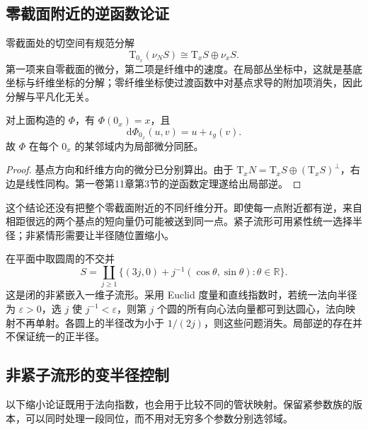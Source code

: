\subsection{零截面附近的逆函数论证}
\label{g2:subsec:1503:02}

零截面处的切空间有规范分解
\[
	\mathrm{T}_{0_x}(\nu_NS)\cong\mathrm{T}_xS\oplus\nu_xS.
\]
第一项来自零截面的微分，第二项是纤维中的速度。在局部丛坐标中，这就是基底坐标与纤维坐标的分解；零纤维坐标使过渡函数中对基点求导的附加项消失，因此分解与平凡化无关。

\begin{proposition}\label{g2:prop:normal-exponential-local}
	对上面构造的 \(\Phi\)，有 \(\Phi(0_x)=x\)，且
	\[
		\mathrm{d}\Phi_{0_x}(u,v)=u+\iota_g(v).
	\]
	故 \(\Phi\) 在每个 \(0_x\) 的某邻域内为局部微分同胚。
\end{proposition}
\begin{proof}
	基点方向和纤维方向的微分已分别算出。由于 \(\mathrm{T}_xN=\mathrm{T}_xS\oplus(\mathrm{T}_xS)^\perp\)，右边是线性同构。第一卷第11章第3节的逆函数定理遂给出局部逆。
\end{proof}

这个结论还没有把整个零截面附近的不同纤维分开。即使每一点附近都有逆，来自相距很远的两个基点的短向量仍可能被送到同一点。紧子流形可用紧性统一选择半径；非紧情形需要让半径随位置缩小。

\begin{example}\label{g2:exm:shrinking-circle-tubes}
	在平面中取圆周的不交并
	\[
		S=\coprod_{j\ge1}\{(3j,0)+j^{-1}(\cos\theta,\sin\theta):\theta\in\mathbb R\}.
	\]
	这是闭的非紧嵌入一维子流形。采用 Euclid 度量和直线指数时，若统一法向半径为 \(\varepsilon>0\)，选 \(j\) 使 \(j^{-1}<\varepsilon\)，则第 \(j\) 个圆的所有向心法向量都可到达圆心，法向映射不再单射。各圆上的半径改为小于 \(1/(2j)\)，则这些问题消失。局部逆的存在并不保证统一的正半径。
\end{example}

\subsection{非紧子流形的变半径控制}
\label{g2:subsec:1503:03}

以下缩小论证既用于法向指数，也会用于比较不同的管状映射。保留紧参数族的版本，可以同时处理一段同位，而不用对无穷多个参数分别选邻域。


